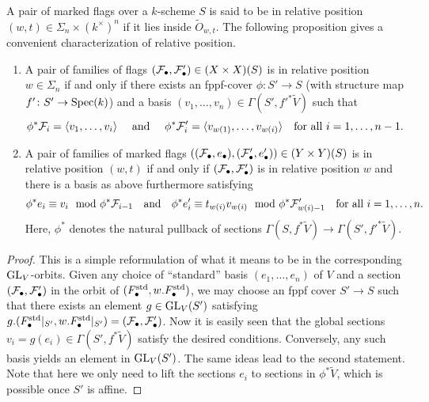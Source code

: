 \documentclass[../main.tex]{subfiles}
\begin{document}
A pair of marked flags over a $k$-scheme $S$ is said to be in relative position
$(w,t) \in \Sigma_n \times (k^\times)^n$ if it lies inside $\tilde O_{w,t}$.
The following proposition gives a convenient characterization of relative position.

\begin{lem}\label{lem:RelativePositionVecCrit}
  \begin{enumerate}
    \item A pair of families of flags $(\mathcal{F}_\bullet, \mathcal{F}_\bullet') \in (X \times X)(S)$ is 
      in relative position $w \in \Sigma_n$ if and only if there exists an
      fppf-cover $ \phi\colon  S' \to S$ (with structure map $f'\colon S' \to \operatorname{Spec}(k)$) and a basis $(v_1, \dots, v_n) \in \Gamma(S', f'^*\tilde V)$ such
      that 
      \begin{equation*}
        \phi^* \mathcal{F}_i  = \langle v_1, \dots, v_i \rangle
        \quad \text{ and } \quad 
        \phi^* \mathcal{F}'_i  = \langle v_{w(1)}, \dots, v_{w(i)} \rangle 
        \quad \text{for all } i = 1, \dots, n-1.
      \end{equation*}
    \item A pair of families of marked flags $((\mathcal{F}_\bullet, e_\bullet), (\mathcal{F}_\bullet', e_\bullet'))
      \in (Y \times Y)(S)$
      is in relative position $(w,t)$ if and only if $(\mathcal{F}_\bullet, \mathcal{F}_\bullet')$ is in relative
      position $w$ and there is a basis as above furthermore satisfying
      \begin{equation*}
        \phi^* e_i \equiv v_i \mod \phi^*\mathcal{F}_{i-1} \quad \text{and} \quad
        \phi^*e'_i \equiv t_{w(i)}v_{w(i)} \mod \phi^*\mathcal{F}'_{w(i)-1} \quad
        \text{for all } i = 1, \dots, n.
      \end{equation*}
      Here, $\phi^*$ denotes the natural pullback of sections
      $\Gamma(S, f^*\tilde V) \to \Gamma(S', f'^* \tilde V)$.
  \end{enumerate}
\begin{proof}
  This is a simple reformulation of what it means to be in the corresponding $\operatorname{GL}_V$-orbits. Given any choice 
  of “standard” basis $(e_1, \dots, e_n)$ of $V$ and a section $(\mathcal{F}_\bullet, \mathcal{F}_\bullet')$
  in the orbit of $(F_\bullet^{\mathrm{std}}, w.F_\bullet^{\mathrm{std}})$, we
  may choose an fppf cover $S' \to S$ such that there exists an element $g \in \operatorname{GL}_V(S')$ 
  satisfying $g.(F_\bullet^{\mathrm{std}}|_{S'}, w.F_\bullet^{\mathrm{std}}|_{S'}) = (\mathcal{F}_\bullet, \mathcal{F}_\bullet')$.
  Now it is easily seen that the global sections $v_i = g(e_i) \in \Gamma(S',
  f^*\tilde V)$ satisfy the desired conditions. Conversely, any such basis
  yields an element in $\operatorname{GL}_V(S')$. The same ideas lead to the second statement.
  Note that here we only need to lift the sections $e_i$ to sections 
  in $\phi^* \tilde V$, which is possible once $S'$ is affine. 
\end{proof}
\end{lem}
\end{document}
